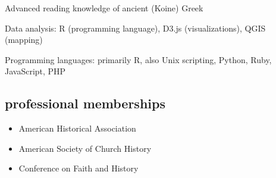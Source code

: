 \documentclass[11pt]{article}
\providecommand{\tightlist}{%
  \setlength{\itemsep}{0pt}\setlength{\parskip}{0pt}}
\begin{document}
Advanced reading knowledge of ancient (Koine) Greek

Data analysis: R (programming language), D3.js (visualizations), QGIS
(mapping)

Programming languages: primarily R, also Unix scripting, Python, Ruby, 
JavaScript, PHP

\subsection{professional memberships}\label{professional-memberships}

\begin{itemize}
    \tightlist
  \item
    American Historical Association
  \item
    American Society of Church History
  \item
    Conference on Faith and History
\end{itemize}
\end{document}
